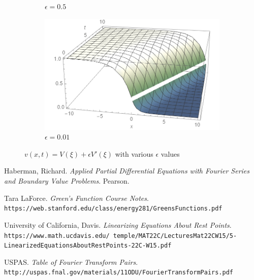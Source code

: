 \documentclass[12pt]{article}
\begin{document}
\begin{figure}[H]
\begin{subfigure}[h]{0.4\textwidth}
        \caption{$\epsilon=0.5$}
        \label{fig:t10}
    \end{subfigure}
    \begin{subfigure}[h]{0.4\textwidth}
        \includegraphics[width=\textwidth]{Part2Plots/e0}
        \caption{$\epsilon=0.01$}
        \label{fig:t100}
    \end{subfigure}
    \caption{$v(x,t) = V(\xi) + \epsilon V'(\xi)$ with various $\epsilon$ values}\label{fig:timeplots}
\end{figure}

\begin{thebibliography}{9}

Haberman, Richard.
\textit{Applied Partial Differential Equations with Fourier Series and Boundary Value Problems}.
Pearson.

Tara LaForce.
\textit{Green's Function Course Notes}. \\
\texttt{https://web.stanford.edu/class/energy281/GreensFunctions.pdf}

University of California, Davis.
\textit{Linearizing Equations About Rest Points}. \\
\texttt{https://www.math.ucdavis.edu/~temple/MAT22C/LecturesMat22CW15/5-\\LinearizedEquationsAboutRestPoints-22C-W15.pdf}

USPAS.
\textit{Table of Fourier Transform Pairs}. \\\texttt{http://uspas.fnal.gov/materials/11ODU/FourierTransformPairs.pdf}

\end{thebibliography}
\end{document}
